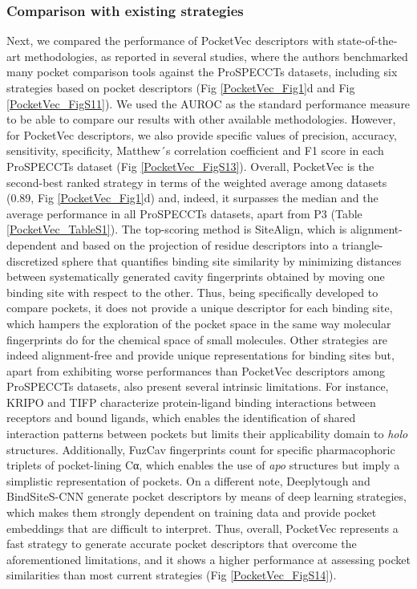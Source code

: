 \subsubsection{Comparison with existing strategies}
\label{PocketVec_ResultsAndDiscussion_Comparison_with_existing_strategies}

Next, we compared the performance of PocketVec descriptors with state-of-the-art methodologies, as reported in several studies\cite{simonovsky_deeplytough_2020, scott_classification_2022, ehrt_benchmark_2018}, where the authors benchmarked many pocket comparison tools against the ProSPECCTs datasets, including six strategies based on pocket descriptors (Fig \ref{PocketVec_Fig1}d and Fig \ref{PocketVec_FigS11}). We used the AUROC as the standard performance measure to be able to compare our results with other available methodologies. However, for PocketVec descriptors, we also provide specific values of precision, accuracy, sensitivity, specificity, Matthew´s correlation coefficient and F1 score in each ProSPECCTs dataset (Fig \ref{PocketVec_FigS13}). Overall, PocketVec is the second-best ranked strategy in terms of the weighted average among datasets (0.89, Fig \ref{PocketVec_Fig1}d) and, indeed, it surpasses the median and the average performance in all ProSPECCTs datasets, apart from P3 (Table \ref{PocketVec_TableS1}). The top-scoring method is SiteAlign\cite{schalon_simple_2008}, which is alignment-dependent and based on the projection of residue descriptors into a triangle-discretized sphere that quantifies binding site similarity by minimizing distances between systematically generated cavity fingerprints obtained by moving one binding site with respect to the other. Thus, being specifically developed to compare pockets, it does not provide a unique descriptor for each binding site, which hampers the exploration of the pocket space in the same way molecular fingerprints do for the chemical space of small molecules. Other strategies are indeed alignment-free and provide unique representations for binding sites but, apart from exhibiting worse performances than PocketVec descriptors among ProSPECCTs datasets, also present several intrinsic limitations. For instance, KRIPO\cite{wood_pharmacophore_2012} and TIFP\cite{desaphy_encoding_2013} characterize protein-ligand binding interactions between receptors and bound ligands, which enables the identification of shared interaction patterns between pockets but limits their applicability domain to \textit{holo} structures. Additionally, FuzCav\cite{weill_alignment-free_2010} fingerprints count for specific pharmacophoric triplets of pocket-lining Cα, which enables the use of \textit{apo} structures but imply a simplistic representation of pockets. On a different note, Deeplytough\cite{simonovsky_deeplytough_2020} and BindSiteS-CNN\cite{scott_classification_2022} generate pocket descriptors by means of deep learning strategies, which makes them strongly dependent on training data and provide pocket embeddings that are difficult to interpret. Thus, overall, PocketVec represents a fast strategy to generate accurate pocket descriptors that overcome the aforementioned limitations, and it shows a higher performance at assessing pocket similarities than most current strategies (Fig \ref{PocketVec_FigS14}).
